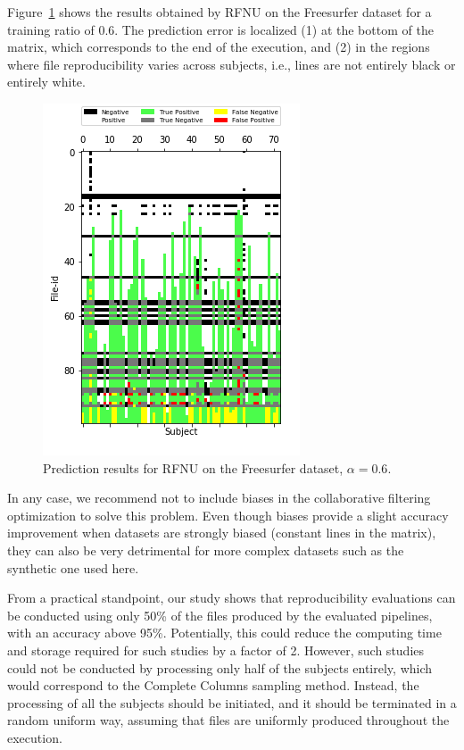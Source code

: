 \documentclass[10pt, conference, compsocconf]{IEEEtran}
\begin{document}
Figure~\ref{fig:error-locality} shows the results obtained by RFNU on 
the Freesurfer dataset for a training ratio of 0.6. The prediction 
error is localized (1) at the bottom of the matrix, which corresponds 
to the end of the execution, and (2) in the regions where file 
reproducibility varies across subjects, i.e., lines are not entirely 
black or entirely white.
\begin{figure}
\includegraphics[width=0.6\columnwidth]{figures/RFNU_FS100F_ALS_06_test_data_matrix_run1.png}
\caption{Prediction results for RFNU on the Freesurfer dataset, $\alpha=0.6$.}
\label{fig:error-locality}
\end{figure}


In any case, we recommend not to include biases in the collaborative filtering 
optimization to solve this problem. Even though biases provide a slight 
accuracy improvement when datasets are strongly biased (constant lines 
in the matrix), they can also be very detrimental for more complex 
datasets such as the synthetic one used here.

From a practical standpoint, our study shows that reproducibility 
evaluations can be conducted using only 50\% of the files produced by 
the evaluated pipelines, with an accuracy above 95\%. Potentially, this 
could reduce the computing time and storage required for such studies 
by a factor of 2. However, such studies could not be conducted by 
processing only half of the subjects entirely, which would correspond 
to the Complete Columns sampling method. Instead, the processing of all 
the subjects should be initiated, and it should be terminated in a random
uniform way, assuming that files are uniformly produced throughout the 
execution.
\end{document}
